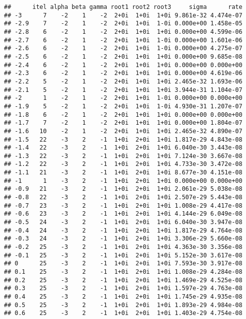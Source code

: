 \documentclass[
  12pt,
]{article}
\begin{document}
\begin{verbatim}
##      itel alpha beta gamma root1 root2 root3     sigma      rate
## -3      7    -2    1    -2  2+0i  1+0i  1+0i 9.861e-32 4.474e-07
## -2.9    7    -2    1    -2  2+0i  1+0i  1-0i 0.000e+00 1.458e-05
## -2.8    6    -2    1    -2  2+0i  1+0i  1+0i 0.000e+00 4.599e-06
## -2.7    6    -2    1    -2  2+0i  1+0i  1-0i 0.000e+00 1.601e-06
## -2.6    6    -2    1    -2  2+0i  1+0i  1-0i 0.000e+00 4.275e-07
## -2.5    6    -2    1    -2  2+0i  1+0i  1+0i 0.000e+00 9.685e-08
## -2.4    6    -2    1    -2  2+0i  1+0i  1+0i 0.000e+00 0.000e+00
## -2.3    6    -2    1    -2  2+0i  1+0i  1+0i 0.000e+00 4.619e-06
## -2.2    5    -2    1    -2  2+0i  1+0i  1+0i 2.465e-32 1.693e-06
## -2.1    5    -2    1    -2  2+0i  1+0i  1+0i 3.944e-31 1.104e-07
## -2      1    -2    1    -2  2+0i  1+0i  1-0i 0.000e+00 0.000e+00
## -1.9    5    -2    1    -2  2+0i  1+0i  1-0i 4.930e-31 1.207e-07
## -1.8    6    -2    1    -2  2+0i  1+0i  1+0i 0.000e+00 0.000e+00
## -1.7    7    -2    1    -2  2+0i  1+0i  1+0i 0.000e+00 1.804e-07
## -1.6   10    -2    1    -2  2+0i  1+0i  1+0i 2.465e-32 4.890e-07
## -1.5   22    -3    2    -1  1+0i  2+0i  1+0i 1.817e-29 4.843e-08
## -1.4   22    -3    2    -1  1+0i  2+0i  1+0i 6.040e-30 3.443e-08
## -1.3   22    -3    2    -1  1+0i  2+0i  1+0i 7.124e-30 3.667e-08
## -1.2   22    -3    2    -1  1+0i  2+0i  1+0i 4.733e-30 3.472e-08
## -1.1   21    -3    2    -1  1+0i  2+0i  1+0i 8.677e-30 4.151e-08
## -1      1    -3    2    -1  1+0i  2+0i  1+0i 0.000e+00 0.000e+00
## -0.9   21    -3    2    -1  1+0i  2+0i  1+0i 2.061e-29 5.038e-08
## -0.8   22    -3    2    -1  1+0i  2+0i  1+0i 2.507e-29 5.443e-08
## -0.7   23    -3    2    -1  1+0i  2+0i  1+0i 1.008e-29 4.417e-08
## -0.6   23    -3    2    -1  1+0i  2+0i  1+0i 4.144e-29 6.049e-08
## -0.5   24    -3    2    -1  1+0i  2+0i  1+0i 6.040e-30 3.947e-08
## -0.4   24    -3    2    -1  1+0i  2+0i  1+0i 1.817e-29 4.764e-08
## -0.3   24    -3    2    -1  1+0i  2+0i  1+0i 3.306e-29 5.660e-08
## -0.2   25    -3    2    -1  1+0i  2+0i  1+0i 4.363e-30 3.356e-08
## -0.1   25    -3    2    -1  1+0i  2+0i  1+0i 5.152e-30 3.617e-08
## 0      25    -3    2    -1  1+0i  2+0i  1+0i 7.593e-30 3.917e-08
## 0.1    25    -3    2    -1  1+0i  2+0i  1+0i 1.008e-29 4.284e-08
## 0.2    25    -3    2    -1  1+0i  2+0i  1+0i 1.469e-29 4.525e-08
## 0.3    25    -3    2    -1  1+0i  2+0i  1+0i 1.597e-29 4.763e-08
## 0.4    25    -3    2    -1  1+0i  2+0i  1+0i 1.745e-29 4.935e-08
## 0.5    25    -3    2    -1  1+0i  2+0i  1+0i 1.893e-29 4.984e-08
## 0.6    25    -3    2    -1  1+0i  2+0i  1+0i 1.403e-29 4.754e-08

\end{verbatim}
\end{document}
